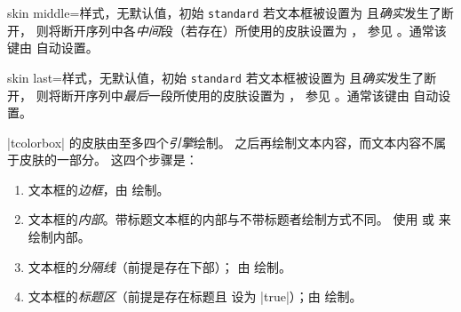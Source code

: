\begin{docTcbKey}{skin middle}{=}{样式，无默认值，初始 \texttt{standard}}
  若文本框被设置为  且\emph{确实}发生了断开，
  则将断开序列中各\emph{中间}段（若存在）所使用的皮肤设置为 ，
  参见 。通常该键由  自动设置。
\end{docTcbKey}


\begin{docTcbKey}{skin last}{=}{样式，无默认值，初始 \texttt{standard}}
  若文本框被设置为  且\emph{确实}发生了断开，
  则将断开序列中\emph{最后}一段所使用的皮肤设置为 ，
  参见 。通常该键由  自动设置。
\end{docTcbKey}


\clearpage

|tcolorbox| 的皮肤由至多四个\emph{引擎}绘制。
之后再绘制文本内容，而文本内容不属于皮肤的一部分。
这四个步骤是：
\begin{enumerate}
\item 文本框的\emph{边框}，由  绘制。
\item 文本框的\emph{内部}。带标题文本框的内部与不带标题者绘制方式不同。
  使用  或 
  来绘制内部。
\item 文本框的\emph{分隔线}（前提是存在下部）；
  由  绘制。
\item 文本框的\emph{标题区}（前提是存在标题且
   设为 |true|）；由
   绘制。
\end{enumerate}

